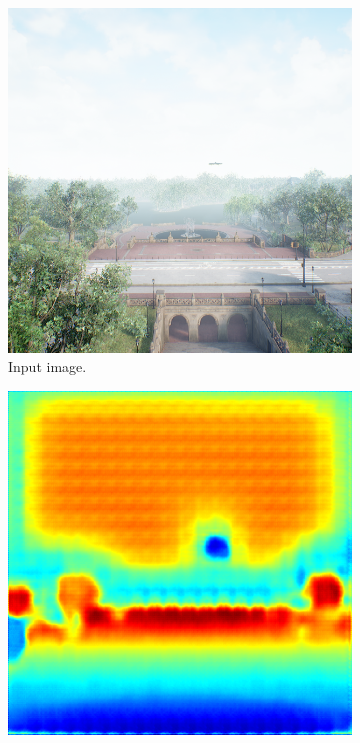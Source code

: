 \documentclass[twoside]{ctuthesis}
\theoremstyle{plain}
\theoremstyle{definition}
\theoremstyle{note}
\begin{document}
\begin{figure}
	\centering
	\begin{subfigure}[b]{0.4\textwidth}
		\centering
		\includegraphics[width=\textwidth]{s2d_input.png}
		\caption{Input image.}
	\end{subfigure}
	\hfill
	\begin{subfigure}[b]{0.4\textwidth}
		\centering
		\includegraphics[width=\textwidth]{raws2d_output.png}

\end{subfigure}
\end{figure}
\end{document}
